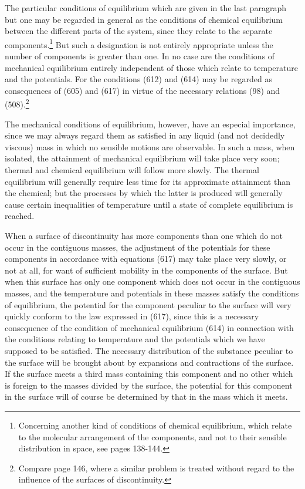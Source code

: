 \documentclass[12pt]{article}
\begin{document}
The particular conditions of equilibrium which are given in the last paragraph but one may be regarded in general as the conditions of chemical equilibrium  between the different parts of the system, since they relate to the separate components.\footnote{Concerning another kind of conditions of chemical equilibrium, which relate to the molecular arrangement of the components, and not to their sensible distribution in space, see pages 138-144.} But such a designation is not entirely appropriate unless the number of components is greater than one. In no case are the conditions of mechanical equilibrium entirely independent of those which relate to temperature and the potentials. For the conditions (612) and (614) may be regarded as consequences of (605) and (617) in virtue of the necessary relations (98) and (508).\footnote{Compare page 146, where a similar problem is treated without regard to the influence of the surfaces of discontinuity.}

The mechanical conditions of equilibrium, however, have an especial importance, since we may always regard them as satisfied in any liquid (and not decidedly viscous) mass in which no sensible motions are observable. In such a mass, when isolated, the attainment of mechanical equilibrium will take place very soon; thermal and chemical equilibrium will follow more slowly. The thermal equilibrium will generally require less time for its approximate attainment than the chemical; but the processes by which the latter is produced will generally cause certain inequalities of temperature until a state of complete equilibrium is reached.

When a surface of discontinuity has more components than one which do not occur in the contiguous masses, the adjustment of the potentials for these components in accordance with equations (617) may take place very slowly, or not at all, for want of sufficient mobility in the components of the surface. But when this surface has only one component which does not occur in the contiguous masses, and the temperature and potentials in these masses satisfy the conditions of equilibrium, the potential for the component peculiar to the surface will very quickly conform to the law expressed in (617), since this is a necessary consequence of the condition of mechanical equilibrium (614) in connection with the conditions relating to temperature and the potentials which we have supposed to be satisfied. The necessary distribution of the substance peculiar to the surface will be brought about by expansions and contractions of the surface. If the surface meets a third mass containing this component and no other which is foreign to the masses divided by the surface, the potential for this component in the surface will of course be determined by that in the mass which it meets.
\end{document}
